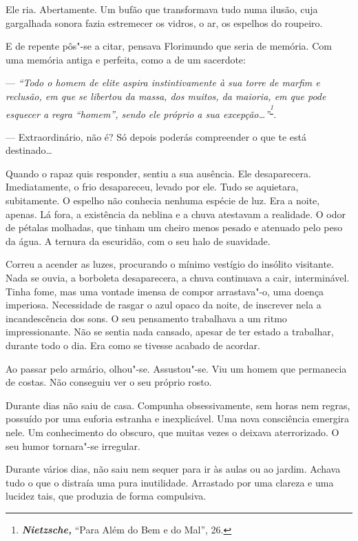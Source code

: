 Ele ria. Abertamente. Um bufão que transformava tudo numa ilusão, cuja
gargalhada sonora fazia estremecer os vidros, o ar, os espelhos do
roupeiro.

E de repente pôs"-se a citar, pensava Florimundo que seria de memória.
Com uma memória antiga e perfeita, como a de um sacerdote:

--- \emph{``Todo o homem de elite aspira instintivamente à sua torre de
marfim e reclusão, em que se libertou da massa, dos muitos, da maioria,
em que pode esquecer a regra ``homem'', sendo ele próprio a sua
excepção\ldots{}''}\textsuperscript{\emph{\footnote{\emph{\textbf{Nietzsche,
  }}``Para Além do Bem e do Mal'', 26.}}}\emph{.}

--- Extraordinário, não é? Só depois poderás compreender o que te está
destinado\ldots{}

Quando o rapaz quis responder, sentiu a sua ausência. Ele desaparecera.
Imediatamente, o frio desapareceu, levado por ele. Tudo se aquietara,
subitamente. O espelho não conhecia nenhuma espécie de luz. Era a noite,
apenas. Lá fora, a existência da neblina e a chuva atestavam a
realidade. O odor de pétalas molhadas, que tinham um cheiro menos pesado
e atenuado pelo peso da água. A ternura da escuridão, com o seu halo de
suavidade.

Correu a acender as luzes, procurando o mínimo vestígio do insólito
visitante. Nada se ouvia, a borboleta desaparecera, a chuva continuava a
cair, interminável. Tinha fome, mas uma vontade imensa de compor
arrastava"-o, uma doença imperiosa. Necessidade de rasgar o azul opaco da
noite, de inscrever nela a incandescência dos sons. O seu pensamento
trabalhava a um ritmo impressionante. Não se sentia nada cansado, apesar
de ter estado a trabalhar, durante todo o dia. Era como se tivesse
acabado de acordar.

Ao passar pelo armário, olhou"-se. Assustou"-se. Viu um homem que
permanecia de costas. Não conseguiu ver o seu próprio rosto.

Durante dias não saiu de casa. Compunha obsessivamente, sem horas nem
regras, possuído por uma euforia estranha e inexplicável. Uma nova
consciência emergira nele. Um conhecimento do obscuro, que muitas vezes
o deixava aterrorizado. O seu humor tornara"-se irregular.

Durante vários dias, não saiu nem sequer para ir às aulas ou ao jardim.
Achava tudo o que o distraía uma pura inutilidade. Arrastado por uma
clareza e uma lucidez tais, que produzia de forma compulsiva.

